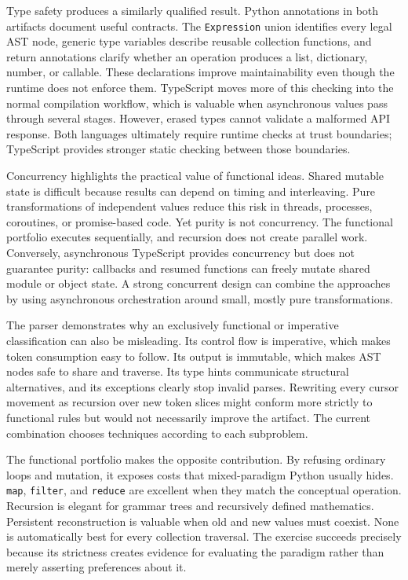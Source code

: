 \documentclass[12pt]{article}
\begin{document}
Type safety produces a similarly qualified result. Python annotations in both artifacts document useful contracts. The \texttt{Expression} union identifies every legal AST node, generic type variables describe reusable collection functions, and return annotations clarify whether an operation produces a list, dictionary, number, or callable. These declarations improve maintainability even though the runtime does not enforce them. TypeScript moves more of this checking into the normal compilation workflow, which is valuable when asynchronous values pass through several stages. However, erased types cannot validate a malformed API response. Both languages ultimately require runtime checks at trust boundaries; TypeScript provides stronger static checking between those boundaries.


Concurrency highlights the practical value of functional ideas. Shared mutable state is difficult because results can depend on timing and interleaving. Pure transformations of independent values reduce this risk in threads, processes, coroutines, or promise-based code. Yet purity is not concurrency. The functional portfolio executes sequentially, and recursion does not create parallel work. Conversely, asynchronous TypeScript provides concurrency but does not guarantee purity: callbacks and resumed functions can freely mutate shared module or object state. A strong concurrent design can combine the approaches by using asynchronous orchestration around small, mostly pure transformations.


The parser demonstrates why an exclusively functional or imperative classification can also be misleading. Its control flow is imperative, which makes token consumption easy to follow. Its output is immutable, which makes AST nodes safe to share and traverse. Its type hints communicate structural alternatives, and its exceptions clearly stop invalid parses. Rewriting every cursor movement as recursion over new token slices might conform more strictly to functional rules but would not necessarily improve the artifact. The current combination chooses techniques according to each subproblem.


The functional portfolio makes the opposite contribution. By refusing ordinary loops and mutation, it exposes costs that mixed-paradigm Python usually hides. \texttt{map}, \texttt{filter}, and \texttt{reduce} are excellent when they match the conceptual operation. Recursion is elegant for grammar trees and recursively defined mathematics. Persistent reconstruction is valuable when old and new values must coexist. None is automatically best for every collection traversal. The exercise succeeds precisely because its strictness creates evidence for evaluating the paradigm rather than merely asserting preferences about it.
\end{document}
